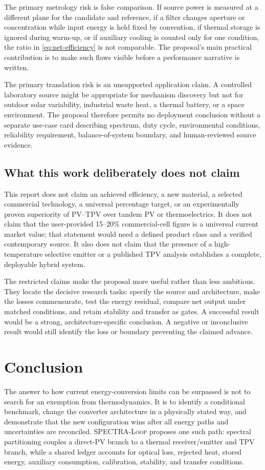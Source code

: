\documentclass[conference]{../../../../Conference-LaTeX-template_10-17-19/IEEEtran}
\newcommand{\spectraloop}{\textsc{SPECTRA-Loop}}
\begin{document}
The primary metrology risk is false comparison. If source power is measured at a different plane for the candidate and reference, if a filter changes aperture or concentration while input energy is held fixed by convention, if thermal storage is ignored during warm-up, or if auxiliary cooling is counted only for one condition, the ratio in \eqref{eq:net-efficiency} is not comparable. The proposal's main practical contribution is to make such flaws visible before a performance narrative is written.

The primary translation risk is an unsupported application claim. A controlled laboratory source might be appropriate for mechanism discovery but not for outdoor solar variability, industrial waste heat, a thermal battery, or a space environment. The proposal therefore permits no deployment conclusion without a separate use-case card describing spectrum, duty cycle, environmental conditions, reliability requirement, balance-of-system boundary, and human-reviewed source evidence.

\subsection{What this work deliberately does not claim}
This report does not claim an achieved efficiency, a new material, a selected commercial technology, a universal percentage target, or an experimentally proven superiority of PV--TPV over tandem PV or thermoelectrics. It does not claim that the user-provided 15--20\% commercial-cell figure is a universal current market value; that statement would need a defined product class and a verified contemporary source. It also does not claim that the presence of a high-temperature selective emitter or a published TPV analysis establishes a complete, deployable hybrid system.

The restricted claims make the proposal more useful rather than less ambitious. They locate the decisive research tasks: specify the source and architecture, make the losses commensurate, test the energy residual, compare net output under matched conditions, and retain stability and transfer as gates. A successful result would be a strong, architecture-specific conclusion. A negative or inconclusive result would still identify the loss or boundary preventing the claimed advance.

\section{Conclusion}
The answer to how current energy-conversion limits can be surpassed is not to search for an exemption from thermodynamics. It is to identify a conditional benchmark, change the converter architecture in a physically stated way, and demonstrate that the new configuration wins after all energy paths and uncertainties are reconciled. \spectraloop{} proposes one such path: spectral partitioning couples a direct-PV branch to a thermal receiver/emitter and TPV branch, while a shared ledger accounts for optical loss, rejected heat, stored energy, auxiliary consumption, calibration, stability, and transfer conditions.
\end{document}
